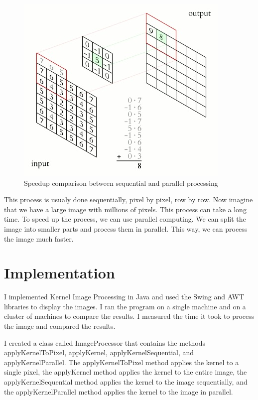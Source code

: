 \documentclass{article}
\begin{document}
\begin{multicols}{2}
    \begin{figure}[H]
        \centering
        \includegraphics[width=\linewidth]{img/kernel.jpg}
        \caption{Speedup comparison between sequential and parallel processing}
        \label{fig:Kernel}
    \end{figure}


    This process is usualy done sequentially, pixel by pixel, row by row. Now imagine that we have a large image with millions of pixels. This process can take a long time. To speed up the process, we can use parallel computing. We can split the image into smaller parts and process them in parallel. This way, we can process the image much faster.

    \section{Implementation}
    I implemented Kernel Image Processing in Java and used the Swing and AWT libraries to display the images. I ran the program on a single machine and on a cluster of machines to compare the results. I measured the time it took to process the image and compared the results.

    I created a class called ImageProcessor that contains the methods applyKernelToPixel, applyKernel, applyKernelSequential, and applyKernelParallel. The applyKernelToPixel method applies the kernel to a single pixel, the applyKernel method applies the kernel to the entire image, the applyKernelSequential method applies the kernel to the image sequentially, and the applyKernelParallel method applies the kernel to the image in parallel.


\end{multicols}
\end{document}
